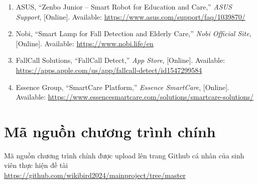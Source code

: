 \documentclass[a4paper,12pt]{report}
\begin{document}
\begin{enumerate}
		\item ASUS, “Zenbo Junior – Smart Robot for Education and Care,” \textit{ASUS Support}, [Online]. Available: \url{https://www.asus.com/support/faq/1039870/}
		
		\item Nobi, “Smart Lamp for Fall Detection and Elderly Care,” \textit{Nobi Official Site}, [Online]. Available: \url{https://www.nobi.life/en}
		
		\item FallCall Solutions, “FallCall Detect,” \textit{App Store}, [Online]. Available: \url{https://apps.apple.com/us/app/fallcall-detect/id1547299584}
		
		\item Essence Group, “SmartCare Platform,” \textit{Essence SmartCare}, [Online]. Available: \url{https://www.essencesmartcare.com/solutions/smartcare-solutions/}
	\end{enumerate}
	
	\section*{Mã nguồn chương trình chính}
	Mã nguồn chương trình chính được upload lên trang Github cá nhân của sinh viên thực hiện đề tài \\
	
	\url{https://github.com/wikibird2024/mainproject/tree/master}
	
	
\end{document}
